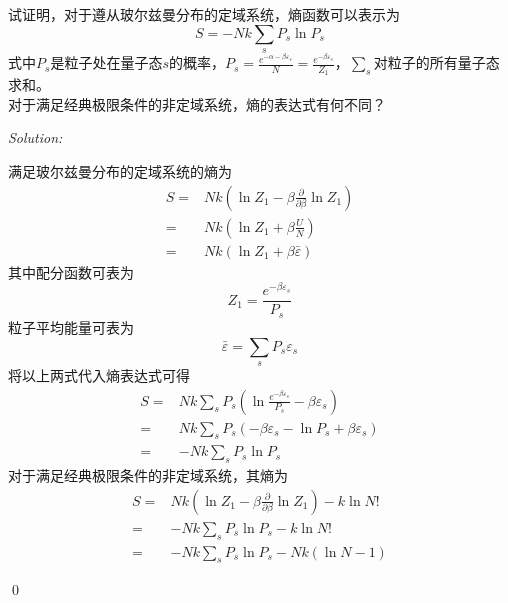 \documentclass[12pt,a4paper]{article}
\newenvironment{problem}[2][Problem]{\begin{trivlist}
\item[\hskip \labelsep {\bfseries #1}\hskip \labelsep {\bfseries #2.}]}{\end{trivlist}}
\newenvironment{sol}
    {\emph{Solution:}
    }
    {
    \qed
    }
\begin{document}
\begin{problem}{7.4}
试证明，对于遵从玻尔兹曼分布的定域系统，熵函数可以表示为
\[
S=-Nk\sum_sP_s\ln P_s
\]
式中$P_s$是粒子处在量子态$s$的概率，$P_s=\frac{e^{-\alpha-\beta\varepsilon_s}}{N}=\frac{e^{-\beta\varepsilon_s}}{Z_1}$，$\sum_s$对粒子的所有量子态求和。\\
对于满足经典极限条件的非定域系统，熵的表达式有何不同？
\end{problem}
\begin{sol}
满足玻尔兹曼分布的定域系统的熵为
\begin{align}
\nonumber S=&Nk\left(\ln Z_1-\beta\frac{\partial}{\partial\beta}\ln Z_1\right)\\
\nonumber=&Nk(\ln Z_1+\beta\frac{U}{N})\\
=&Nk(\ln Z_1+\beta\bar{\varepsilon})
\end{align}
其中配分函数可表为
\begin{equation}
Z_1=\frac{e^{-\beta\varepsilon_s}}{P_s}
\end{equation}
粒子平均能量可表为
\begin{equation}
\bar{\varepsilon}=\sum_sP_s\varepsilon_s
\end{equation}
将以上两式代入熵表达式可得
\begin{align}
\nonumber S=&Nk\sum_sP_s(\ln\frac{e^{-\beta\varepsilon_s}}{P_s}-\beta\varepsilon_s)\\
\nonumber=&Nk\sum_sP_s(-\beta\varepsilon_s-\ln P_s+\beta\varepsilon_s)\\
=&-Nk\sum_sP_s\ln P_s
\end{align}
对于满足经典极限条件的非定域系统，其熵为
\begin{align}
\nonumber S=&Nk\left(\ln Z_1-\beta\frac{\partial}{\partial\beta}\ln Z_1\right)-k\ln N!\\
\nonumber=&-Nk\sum_sP_s\ln P_s-k\ln N!\\
=&-Nk\sum_sP_s\ln P_s-Nk(\ln N-1)
\end{align}
\end{sol}
\end{document}
